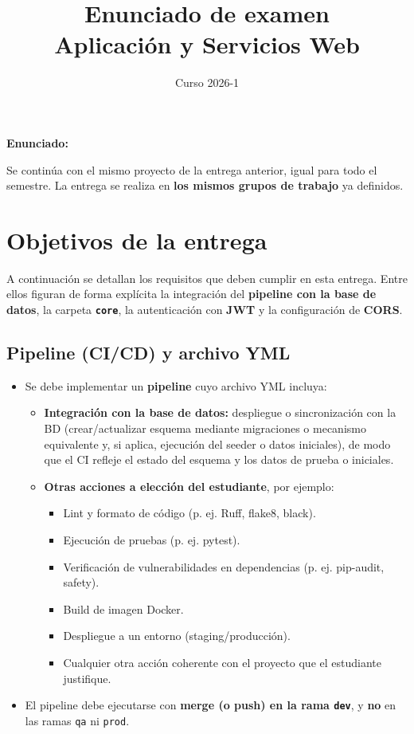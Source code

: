 \documentclass[11pt,a4paper]{article}
\title{Enunciado de examen \\ Aplicación y Servicios Web}
\author{Curso 2026-1}
\date{}
\newenvironment{enunciado}{\begin{leftbar}\noindent\textbf{Enunciado:}\par\vspace{0.3em}}{\end{leftbar}}
\begin{document}
\maketitle
\thispagestyle{empty}
\vspace{1em}

\begin{enunciado}
Se continúa con el mismo proyecto de la entrega anterior, igual para todo el semestre. La entrega se realiza en \textbf{los mismos grupos de trabajo} ya definidos.
\end{enunciado}

\section{Objetivos de la entrega}

A continuación se detallan los requisitos que deben cumplir en esta entrega. Entre ellos figuran de forma explícita la integración del \textbf{pipeline con la base de datos}, la carpeta \textbf{\texttt{core}}, la autenticación con \textbf{JWT} y la configuración de \textbf{CORS}.

\subsection{Pipeline (CI/CD) y archivo YML}

\begin{itemize}[leftmargin=*]
  \item Se debe implementar un \textbf{pipeline} cuyo archivo YML incluya:
  \begin{itemize}
    \item \textbf{Integración con la base de datos:} despliegue o sincronización con la BD (crear/actualizar esquema mediante migraciones o mecanismo equivalente y, si aplica, ejecución del seeder o datos iniciales), de modo que el CI refleje el estado del esquema y los datos de prueba o iniciales.
    \item \textbf{Otras acciones a elección del estudiante}, por ejemplo:
    \begin{itemize}
      \item Lint y formato de código (p. ej. Ruff, flake8, black).
      \item Ejecución de pruebas (p. ej. pytest).
      \item Verificación de vulnerabilidades en dependencias (p. ej. pip-audit, safety).
      \item Build de imagen Docker.
      \item Despliegue a un entorno (staging/producción).
      \item Cualquier otra acción coherente con el proyecto que el estudiante justifique.
    \end{itemize}
  \end{itemize}
  \item El pipeline debe ejecutarse con \textbf{merge (o push) en la rama \texttt{dev}}, y \textbf{no} en las ramas \texttt{qa} ni \texttt{prod}.
\end{itemize}
\end{document}
